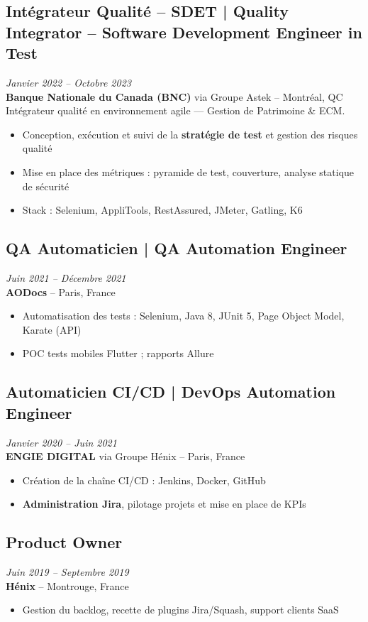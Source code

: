 \documentclass[11pt,a4paper]{article}
\begin{document}
\subsection*{Intégrateur Qualité -- SDET | Quality Integrator -- Software Development Engineer in Test} \hfill \textit{Janvier 2022 -- Octobre 2023}\\
\textbf{Banque Nationale du Canada (BNC)} via Groupe Astek -- Montréal, QC\\
Intégrateur qualité en environnement agile — Gestion de Patrimoine \& ECM.
\begin{itemize}
    \item Conception, exécution et suivi de la \textbf{stratégie de test} et gestion des risques qualité
    \item Mise en place des métriques : pyramide de test, couverture, analyse statique de sécurité
    \item Stack : Selenium, AppliTools, RestAssured, JMeter, Gatling, K6
\end{itemize}

\subsection*{QA Automaticien | QA Automation Engineer} \hfill \textit{Juin 2021 -- Décembre 2021}\\
\textbf{AODocs} -- Paris, France
\begin{itemize}
    \item Automatisation des tests : Selenium, Java 8, JUnit 5, Page Object Model, Karate (API)
    \item POC tests mobiles Flutter ; rapports Allure
\end{itemize}

\subsection*{Automaticien CI/CD | DevOps Automation Engineer} \hfill \textit{Janvier 2020 -- Juin 2021}\\
\textbf{ENGIE DIGITAL} via Groupe Hénix -- Paris, France
\begin{itemize}
    \item Création de la chaîne CI/CD : Jenkins, Docker, GitHub
    \item \textbf{Administration Jira}, pilotage projets et mise en place de KPIs
\end{itemize}

\subsection*{Product Owner} \hfill \textit{Juin 2019 -- Septembre 2019}\\
\textbf{Hénix} -- Montrouge, France
\begin{itemize}
    \item Gestion du backlog, recette de plugins Jira/Squash, support clients SaaS
\end{itemize}
\end{document}
